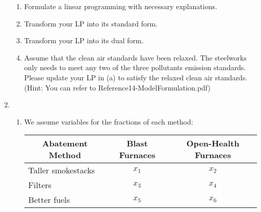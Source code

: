 \documentclass[12pt,a4paper]{article}
\makeatletter
\newtheorem*{solution}{Solution}
\theoremstyle{definition}
\renewenvironment{solution}[1][Solution] {\par\pushQED{\qed}\normalfont\topsep6\p@\@plus6\p@\relax\trivlist\item[\hskip\labelsep\bfseries#1\@addpunct{.}]\ignorespaces}{\popQED\endtrivlist\@endpefalse} \makeatother
\makeatother
\begin{document}
\begin{enumerate}
\begin{table}[h]
    \end{table}
     
    
    \begin{enumerate}
    	\item Formulate a linear programming with necessary explanations.
    	\item
    	Transform your LP into its standard form.
    	\item
    	Transform your LP into its dual form.
    	\item 
    	Assume that the clean air standards have been relaxed. The steelworks only needs to meet any two of the three pollutants emission standards. Please update your LP in (a) to satisfy the relaxed clean air standards. {\color{blue}(Hint: You can refer to Reference14-ModelFormulation.pdf)}
    	
    \end{enumerate}
    \begin{solution}
    	\begin{enumerate}
    		\item We assume variables for the fractions of each method:
    		\begin{table}[h]
    			\centering
    			\footnotesize
    			\label{variable}
    			\renewcommand\arraystretch{1.1}
    			\begin{tabular}{lclcl}
    				\hline
    				\multicolumn{1}{c}{\textbf{Abatement Method}} & \multicolumn{2}{c}{\textbf{Blast Furnaces}} & \multicolumn{2}{c}{\textbf{Open-Health Furnaces}} \\ \hline
    				Taller smokestacks                             & \multicolumn{2}{c}{$ x_1 $}                       & \multicolumn{2}{c}{$ x_2 $}                           \\
    				Filters                                        & \multicolumn{2}{c}{$ x_3 $}                       & \multicolumn{2}{c}{$ x_4 $}                            \\
    				Better fuels                                   & \multicolumn{2}{c}{$ x_5 $}                      & \multicolumn{2}{c}{$ x_6 $}                            \\ \hline
    			\end{tabular}
    			
    		\end{table}
    	

\end{enumerate}
\end{solution}
\end{enumerate}
\end{document}
